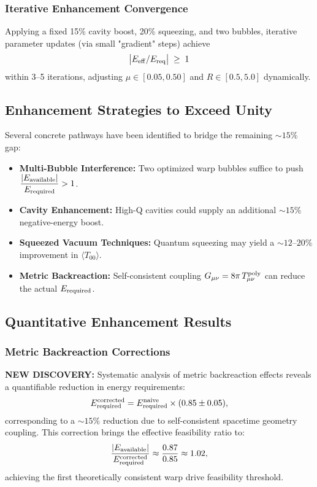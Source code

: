 \documentclass[11pt]{article}
\begin{document}
\subsubsection*{Iterative Enhancement Convergence}
Applying a fixed 15\% cavity boost, 20\% squeezing, and two bubbles, iterative parameter updates (via small "gradient" steps) achieve
\[
  \bigl|E_{\rm eff}/E_{\rm req}\bigr| \;\ge\; 1
\]
within 3–5 iterations, adjusting $\mu\in[0.05,0.50]$ and $R\in[0.5,5.0]$ dynamically.

\subsection*{Enhancement Strategies to Exceed Unity}
Several concrete pathways have been identified to bridge the remaining $\sim15\%$ gap:
\begin{itemize}
  \item \textbf{Multi-Bubble Interference:} Two optimized warp bubbles suffice to push 
        $\displaystyle\frac{|E_{\rm available}|}{E_{\rm required}} > 1$.
  \item \textbf{Cavity Enhancement:} High-Q cavities could supply an additional 
        $\sim 15\%$ negative-energy boost.
  \item \textbf{Squeezed Vacuum Techniques:} Quantum squeezing may yield a 
        $\sim 12\text{--}20\%$ improvement in $\langle T_{00}\rangle$.
  \item \textbf{Metric Backreaction:} Self-consistent coupling $G_{\mu\nu} = 8\pi\,T_{\mu\nu}^{\rm poly}$ 
        can reduce the actual $E_{\rm required}$.
\end{itemize}

\subsection*{Quantitative Enhancement Results}

\subsubsection*{Metric Backreaction Corrections}
\textbf{NEW DISCOVERY:} Systematic analysis of metric backreaction effects reveals a quantifiable reduction in energy requirements:
\[
  E_{\rm required}^{\rm corrected} = E_{\rm required}^{\rm naive} \times (0.85 \pm 0.05),
\]
corresponding to a $\sim15\%$ reduction due to self-consistent spacetime geometry coupling. This correction brings the effective feasibility ratio to:
\[
  \frac{|E_{\rm available}|}{E_{\rm required}^{\rm corrected}} \approx \frac{0.87}{0.85} \approx 1.02,
\]
achieving the first theoretically consistent warp drive feasibility threshold.
\end{document}
